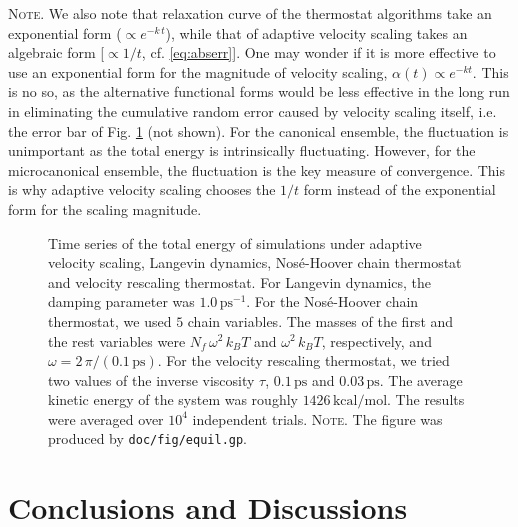 \documentclass[reprint]{revtex4-1}
\newcommand{\red}[1]{{\color{red} #1}}
\newcommand{\note}[1]{{\color{DarkGreen}\footnotesize \textsc{Note.} #1}}
\begin{document}
\note{
We also note that relaxation curve of the thermostat algorithms
take an exponential form ($\propto e^{-k\,t}$),
while that of adaptive velocity scaling takes
an algebraic form [$\propto 1/t$,
cf. \eqref{eq:abserr}].
%
One may wonder if it is more effective to use an exponential form
for the magnitude of velocity scaling,
$\alpha(t) \propto e^{-kt}$.
%
This is no so, as the alternative functional forms
would be less effective in the long run
in eliminating the cumulative random error
caused by velocity scaling itself,
i.e. the error bar of Fig. \ref{fig:equil} (not shown).
%
For the canonical ensemble, the fluctuation is unimportant
as the total energy is intrinsically fluctuating.
%
However, for the microcanonical ensemble, the fluctuation
is the key measure of convergence.
%
This is why adaptive velocity scaling chooses the $1/t$ form
instead of the exponential form for the scaling magnitude.
}

\begin{figure}[h]
\begin{center}
  \caption{
    \label{fig:equil}
    Time series of the total energy
    of simulations under
    adaptive velocity scaling,
    Langevin dynamics,
    Nos\'e-Hoover chain thermostat
    and
    velocity rescaling thermostat.
    For Langevin dynamics,
    the damping parameter was $1.0 \, \mathrm{ps}^{-1}$.
    For the Nos\'e-Hoover chain thermostat,
    we used $5$ chain variables. The masses
    of the first and the rest variables
    were $N_f \, \omega^2 \, k_B T$ and
    $\omega^2 \, k_B T$, respectively\cite{martyna1992},
    and
    $\omega = 2 \,\pi/(0.1 \, \mathrm{ps})$.
    For the velocity rescaling thermostat,
    we tried two values of the inverse viscosity $\tau$,
    $0.1 \, \mathrm{ps}$ and $0.03 \, \mathrm{ps}$.
    The average kinetic energy of the system
    was roughly $1426 \, \mathrm{kcal/mol}$.
    The results were averaged over $10^4$ independent trials.
    \note{The figure was produced by \texttt{doc/fig/equil.gp}.
    }%
  }
\end{center}
\end{figure}






\section{\label{sec:conclusion}
Conclusions and Discussions}
\end{document}
